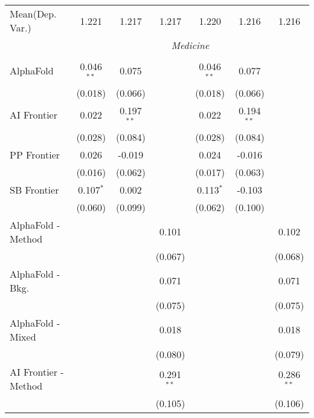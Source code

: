 \begin{tabular}{lcccccc}
Mean(Dep. Var.) & 1.221 & 1.217 & 1.217 & 1.220 & 1.216 & 1.216 \\
 & \multicolumn{6}{c}{\textit{Medicine}} \\ \\
   AlphaFold            & 0.046$^{**}$ & 0.075        &              & 0.046$^{**}$ & 0.077        &   \\   
                        & (0.018)      & (0.066)      &              & (0.018)      & (0.066)      &   \\   
   AI Frontier          & 0.022        & 0.197$^{**}$ &              & 0.022        & 0.194$^{**}$ &   \\   
                        & (0.028)      & (0.084)      &              & (0.028)      & (0.084)      &   \\   
   PP Frontier          & 0.026        & -0.019       &              & 0.024        & -0.016       &   \\   
                        & (0.016)      & (0.062)      &              & (0.017)      & (0.063)      &   \\   
   SB Frontier          & 0.107$^{*}$  & 0.002        &              & 0.113$^{*}$  & -0.103       &   \\   
                        & (0.060)      & (0.099)      &              & (0.062)      & (0.100)      &   \\   
   AlphaFold - Method   &              &              & 0.101        &              &              & 0.102\\   
                        &              &              & (0.067)      &              &              & (0.068)\\   
   AlphaFold - Bkg.     &              &              & 0.071        &              &              & 0.071\\   
                        &              &              & (0.075)      &              &              & (0.075)\\   
   AlphaFold - Mixed    &              &              & 0.018        &              &              & 0.018\\   
                        &              &              & (0.080)      &              &              & (0.079)\\   
   AI Frontier - Method &              &              & 0.291$^{**}$ &              &              & 0.286$^{**}$\\   
                        &              &              & (0.105)      &              &              & (0.106)\\   

\end{tabular}
